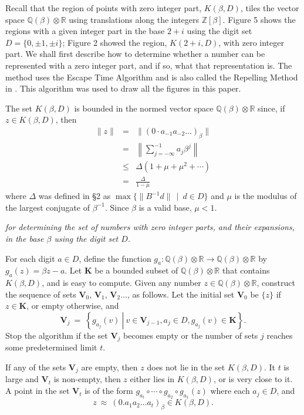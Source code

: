 \documentclass[12pt]{article}
\newcommand{\Q}{\mathbb{Q}}
\newcommand{\R}{\mathbb{R}}
\newcommand{\Z}{\mathbb{Z}}
\begin{document}
    Recall that the region of points with zero integer part, $K(\beta, D)$, tiles the
vector space $\Q(\beta)\otimes\R$ using translations along the integers $\Z[\beta]$. Figure 5
shows the regions with a given integer part in the base $2+i$ using the digit set
$D = \{0, \pm1, \pm i\}$; Figure 2 showed the region, $K(2 + i, D)$, with zero integer
part. We shall first describe how to determine whether a number can be
represented with a zero integer part, and if so, what that representation is.
The method uses the Escape Time Algorithm \cite[\S 7.1]{barnsley} and is also called the
Repelling Method in \cite{pru}. This algorithm was used to draw all the figures
in this paper.

  The set $K(\beta, D)$ is bounded in the normed vector space $\Q(\beta)\otimes\R$ since, if $z\in K(\beta, D)$, then
\begin{eqnarray*}
\|z\| &=& \|(0\cdot a_{-1}a_{-2}\ldots)_{\beta}\| \\
&=& \left\|\sum_{j=-\infty}^{-1} a_j\beta^j\right\| \\
&\leqslant& \Delta(1+\mu+\mu^2+\cdots) \\
&=&\frac{\Delta}{1-\mu}
\end{eqnarray*}
where $\Delta$ was defined in \S2 as $\max\{\|B^{-1}d\| \,\mid\ d\in D\}$ and $\mu$ is the modulus
of the largest conjugate of $\beta^{-1}$. Since $\beta$ is a valid base, $\mu<1$.

\medskip

 {\it
for determining the set of numbers with zero integer parts, and their expansions, in the base $\beta$ using the digit set $D$.

\noindent 
For each digit $a\in D$, define the function 
$g_a:\Q(\beta)\otimes\R\rightarrow\Q(\beta)\otimes\R$ by
$g_a(z)=\beta z -a$. 
Let $\mathbf{K}$ be a bounded subset of $\Q(\beta)\otimes\R$ that contains
$K(\beta, D)$, and is easy to compute. 
Given any number $z\in\Q(\beta)\otimes\R$, construct
the sequence of sets $\mathbf{V}_0$, $\mathbf{V}_1$, $\mathbf{V}_2 \ldots$,  as follows. Let the initial set $\mathbf{V}_0$ be $\{z\}$
if $z\in\mathbf{K}$, or empty otherwise, and
$$
\mathbf{V}_j \ = \ \left\{g_{a_j}(v)\ \right| \left. \ v\in \mathbf{V}_{j-1}, a_j\in D, g_{a_j}(v)\in\mathbf{K} \right\}.
$$
Stop the algorithm if the set $\mathbf{V}_j$ becomes empty or the number of sets $j$ reaches some predetermined limit $t$.

If any of the sets $\mathbf{V}_j$ are empty, then $z$ does not lie in the set $K(\beta, D)$. 
It $t$ is large and $\mathbf{V}_t$ is non-empty, then $z$ either lies in $K(\beta, D)$, or is very close to it. 
A point in the set $\mathbf{V}_t$ is of the form 
$g_{a_t}\circ\cdots\circ g_{a_2}\circ g_{a_1}(z)$
where each $a_j\in D$, and
$$
z \ \approx \ (0.a_1a_2\ldots a_t)_{\beta} \in K(\beta, D).
$$
}
\medskip
\end{document}
